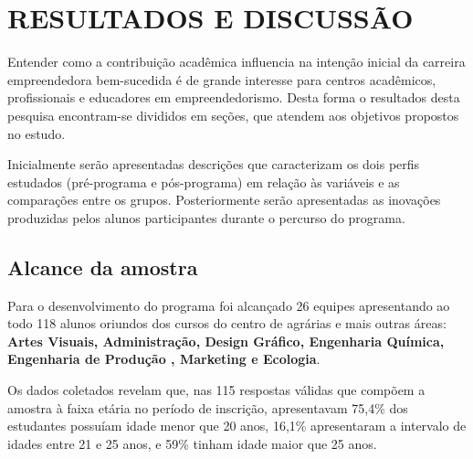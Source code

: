\chapter{RESULTADOS E DISCUSSÃO}

Entender como a contribuição acadêmica influencia na intenção inicial da carreira empreendedora bem-sucedida é de grande interesse para centros acadêmicos, profissionais e educadores em empreendedorismo. 
Desta forma o resultados desta pesquisa encontram-se divididos em seções, que atendem aos objetivos propostos no estudo. 

Inicialmente serão apresentadas descrições que caracterizam os dois perfis estudados (pré-programa  e pós-programa) em relação às variáveis e as comparações entre os grupos.
Posteriormente serão apresentadas as inovações produzidas pelos alunos participantes durante o percurso do programa.

\section{Alcance da amostra}

Para o desenvolvimento do programa foi alcançado 26 equipes apresentando ao todo 118 alunos oriundos dos cursos do centro de agrárias e mais outras áreas: \textbf{Artes Visuais, Administração, Design Gráfico, Engenharia Química, Engenharia de Produção , Marketing e Ecologia}. 

Os dados coletados revelam que, nas 115 respostas válidas que compõem a amostra à faixa etária no período de inscrição, apresentavam 75,4\% dos estudantes possuíam idade menor que 20 anos, 16,1\% apresentaram a intervalo de idades entre 21 e 25 anos, e 59\% tinham idade maior que 25 anos.


